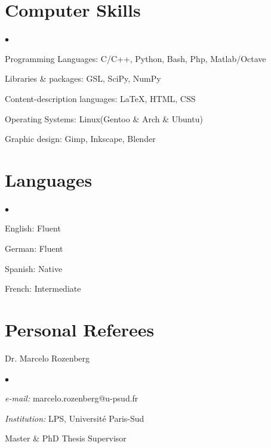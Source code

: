 \documentclass[margin,line]{res}
\newenvironment{list1}{
  \begin{list}{\ding{113}}{%
      \setlength{\itemsep}{0in}
      \setlength{\parsep}{0in} \setlength{\parskip}{0in}
      \setlength{\topsep}{0in} \setlength{\partopsep}{0in}
      \setlength{\leftmargin}{0.17in}}}{\end{list}}
\newenvironment{list2}{
  \begin{list}{$\bullet$}{%
      \setlength{\itemsep}{0in}
      \setlength{\parsep}{0in} \setlength{\parskip}{0in}
      \setlength{\topsep}{0in} \setlength{\partopsep}{0in}
      \setlength{\leftmargin}{0.2in}}}{\end{list}}
\begin{document}
\begin{resume}

\section{\sc Computer Skills}
  \begin{list2}
    \item Programming Languages:  C/C++, Python, Bash, Php, Matlab/Octave
    \item Libraries \& packages: GSL, SciPy, NumPy
    \item Content-description languages: \LaTeX, HTML, CSS
    \item Operating Systems:  Linux(Gentoo \& Arch \& Ubuntu)
    \item Graphic design: Gimp, Inkscape, Blender
  \end{list2}

\section{\sc Languages}
  \begin{list2}
    \item English: Fluent
    \item German: Fluent
    \item Spanish: Native
    \item French: Intermediate
  \end{list2}

\section{\sc Personal Referees}
\begin{list1}
  \item[] Dr. Marcelo Rozenberg
  \begin{list2}
   \item {\it e-mail:} marcelo.rozenberg@u-psud.fr
   \item {\it Institution:} LPS, Université Paris-Sud
   \item Master \& PhD Thesis Supervisor
  \end{list2}
\end{list1}


\end{resume}
\end{document}
